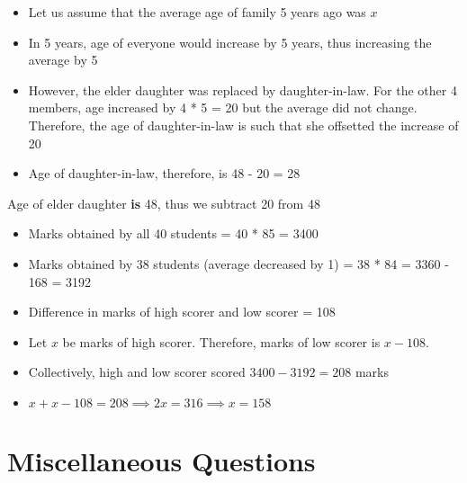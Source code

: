 \begin{itemize}
    \item Let us assume that the average age of family 5 years ago was $x$
    \item In 5 years, age of everyone would increase by 5 years, thus increasing the average by 5
    \item However, the elder daughter was replaced by daughter-in-law. For the other 4 members, age increased by 4 * 5 = 20 but the average did not change. Therefore, the age of daughter-in-law is such that she offsetted the increase of 20
    \item Age of daughter-in-law, therefore, is 48 - 20 = 28
\end{itemize}

\begin{NOTE}
    Age of elder daughter \textbf{is} 48, thus we subtract 20 from 48
\end{NOTE}


\begin{itemize}
    \item Marks obtained by all 40 students = 40 * 85 = 3400
    \item Marks obtained by 38 students (average decreased by 1) = 38 * 84 = 3360 - 168 = 3192
    \item Difference in marks of high scorer and low scorer = 108
    \item Let $x$ be marks of high scorer. Therefore, marks of low scorer is $x - 108$.
    \item Collectively, high and low scorer scored $3400 - 3192 = 208$ marks
    \item $x + x - 108 = 208 \implies 2x = 316 \implies x = 158$  
\end{itemize}


\section{Miscellaneous Questions}


